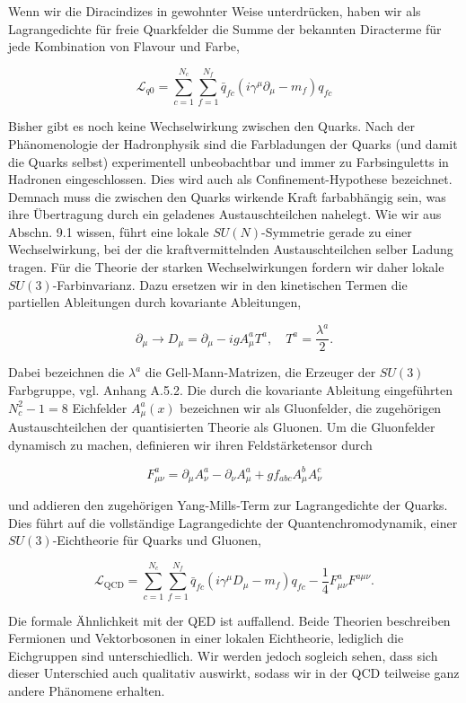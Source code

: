 \documentclass[10pt, letterpaper]{article}
\begin{document}
Wenn wir die Diracindizes in gewohnter Weise unterdrücken, haben wir als Lagrangedichte für freie Quarkfelder die Summe der bekannten Diracterme für jede Kombination von Flavour und Farbe,

$$
\mathscr{L}_{q 0}=\sum_{c=1}^{N_{c}} \sum_{f=1}^{N_{f}} \bar{q}_{f c}\left(i \gamma^{\mu} \partial_{\mu}-m_{f}\right) q_{f c}
$$

Bisher gibt es noch keine Wechselwirkung zwischen den Quarks. Nach der Phänomenologie der Hadronphysik sind die Farbladungen der Quarks (und damit die Quarks selbst) experimentell unbeobachtbar und immer zu Farbsinguletts in Hadronen eingeschlossen. Dies wird auch als Confinement-Hypothese bezeichnet. Demnach muss die zwischen den Quarks wirkende Kraft farbabhängig sein, was ihre Übertragung durch ein geladenes Austauschteilchen nahelegt. Wie wir aus Abschn. 9.1 wissen, führt eine lokale $S U(N)$-Symmetrie gerade zu einer Wechselwirkung, bei der die kraftvermittelnden Austauschteilchen selber Ladung tragen. Für die Theorie der starken Wechselwirkungen fordern wir daher lokale $S U(3)$-Farbinvarianz. Dazu ersetzen wir in den kinetischen Termen die partiellen Ableitungen durch kovariante Ableitungen,

$$
\partial_{\mu} \rightarrow D_{\mu}=\partial_{\mu}-i g A_{\mu}^{a} T^{a}, \quad T^{a}=\frac{\lambda^{a}}{2} .
$$

Dabei bezeichnen die $\lambda^{a}$ die Gell-Mann-Matrizen, die Erzeuger der $S U(3)$ Farbgruppe, vgl. Anhang A.5.2. Die durch die kovariante Ableitung eingeführten\\
$N_{c}^{2}-1=8$ Eichfelder $A_{\mu}^{a}(x)$ bezeichnen wir als Gluonfelder, die zugehörigen Austauschteilchen der quantisierten Theorie als Gluonen. Um die Gluonfelder dynamisch zu machen, definieren wir ihren Feldstärketensor durch

$$
F_{\mu \nu}^{a}=\partial_{\mu} A_{\nu}^{a}-\partial_{\nu} A_{\mu}^{a}+g f_{a b c} A_{\mu}^{b} A_{\nu}^{c}
$$

und addieren den zugehörigen Yang-Mills-Term zur Lagrangedichte der Quarks. Dies führt auf die vollständige Lagrangedichte der Quantenchromodynamik, einer $S U(3)$-Eichtheorie für Quarks und Gluonen,

$$
\mathscr{L}_{\mathrm{QCD}}=\sum_{c=1}^{N_{c}} \sum_{f=1}^{N_{f}} \bar{q}_{f c}\left(i \gamma^{\mu} D_{\mu}-m_{f}\right) q_{f c}-\frac{1}{4} F_{\mu \nu}^{a} F^{a \mu \nu} .
$$

Die formale Ähnlichkeit mit der QED ist auffallend. Beide Theorien beschreiben Fermionen und Vektorbosonen in einer lokalen Eichtheorie, lediglich die Eichgruppen sind unterschiedlich. Wir werden jedoch sogleich sehen, dass sich dieser Unterschied auch qualitativ auswirkt, sodass wir in der QCD teilweise ganz andere Phänomene erhalten.
\end{document}
